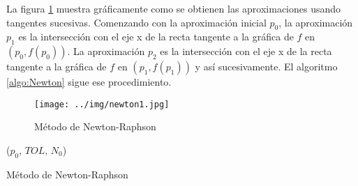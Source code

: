 La figura \ref{fig:metodoNewton} muestra gráficamente como se obtienen las aproximaciones usando tangentes sucesivas. 
Comenzando con la aproximación inicial $p_{0}$, la aproximación $p_{1}$ es la intersección con el eje x de la recta 
tangente a la gráfica de $f$ en $(p_{0}, f(p_{0}))$. La aproximación $p_{2}$ es la intersección con el eje x de 
la recta tangente a la gráfica de $f$ en $(p_{1}, f(p_{1}))$ y así sucesivamente. El algoritmo \ref{algo:Newton} 
sigue ese procedimiento.  

\begin{figure}[H]
	\centering
    \texttt{[image: ../img/newton1.jpg]}
    \caption{Método de Newton-Raphson}
	\label{fig:metodoNewton}
\end{figure}   

\begin{algorithm}[H]

	\Newton($p_{0},\, TOL,\, N_{0}$) 
\caption{Método de Newton-Raphson}
\label{algo:Newton}
\end{algorithm}

